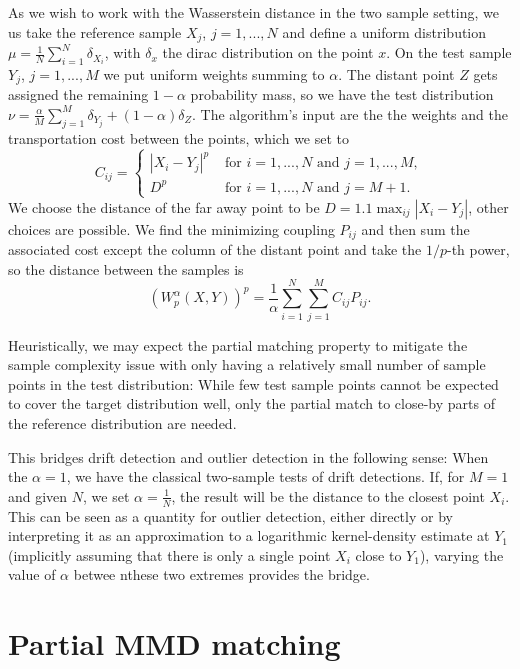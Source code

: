 \documentclass[a4paper,twoside,10pt]{article}
\theoremstyle{plain}
\theoremstyle{remark}
\begin{document}
As we wish to work with the Wasserstein distance in the two sample setting, we us take the reference sample $X_j$, $j=1,...,N$ and define a uniform distribution $\mu = \frac{1}{N} \sum_{i = 1}^N \delta_{X_i}$, with $\delta_x$ the dirac distribution on the point $x$. On the test sample $Y_{j}$, $j=1,...,M$ we put uniform weights summing to $\alpha$. The distant point $Z$ gets assigned the remaining $1-\alpha$ probability mass, so we have the test distribution $\nu = \frac{\alpha}{M} \sum_{j=1}^M \delta_{Y_j} + (1-\alpha) \delta_{Z}$. The algorithm's input are the the weights and the transportation cost between the points, which we set to
\[
  C_{ij} =
  \begin{cases}
    |X_i - Y_j|^p & \text{ for }i = 1,...,N \text{ and } j=1,...,M, \\
    D^p & \text{ for } i = 1,...,N \text{ and } j = M+1.
  \end{cases}
\]
We choose the distance of the far away point to be $D = 1.1 \max_{ij} |X_i - Y_j|$, other choices are possible.
We find the minimizing coupling $P_{ij}$ and then sum the associated cost except the column of the distant point and take the $1/p$-th power, so the distance between the samples is
\[
(  W^\alpha_p (X, Y))^p = \frac{1}{\alpha} \sum_{i=1}^N \sum_{j=1}^M C_{ij} P_{ij}.
\]

Heuristically, we may expect the partial matching property to mitigate the sample complexity issue with only having a relatively small number of sample points in the test distribution: While few test sample points cannot be expected to cover the target distribution well, only the partial match to close-by parts of the reference distribution are needed.

This bridges drift detection and outlier detection in the following sense: When the $\alpha = 1$, we have the classical two-sample tests of drift detections. If, for $M = 1$ and given $N$, we set $\alpha = \frac{1}{N}$, the result will be the distance to the closest point $X_i$. This can be seen as a quantity for outlier detection, either directly or by interpreting it as an approximation to a logarithmic kernel-density estimate at $Y_1$ (implicitly assuming that there is only a single point $X_i$ close to $Y_1$), varying the value of $\alpha$ betwee nthese two extremes provides the bridge.

\section{Partial MMD matching}
\label{sec:partial_mmd}
\end{document}
